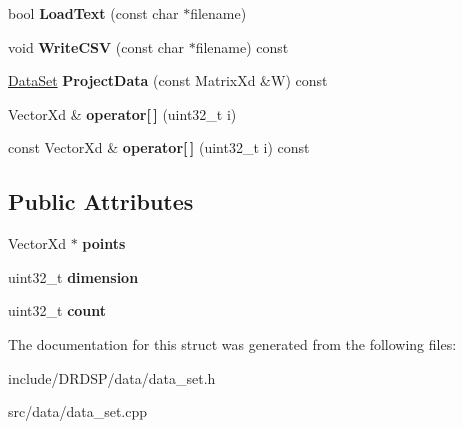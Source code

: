 \begin{DoxyCompactItemize}
\item 
\hypertarget{struct_d_r_d_s_p_1_1_data_set_a9caf2a2c685f1433028de6d3c11bd758}{bool {\bfseries Load\-Text} (const char $\ast$filename)}\label{struct_d_r_d_s_p_1_1_data_set_a9caf2a2c685f1433028de6d3c11bd758}

\item 
\hypertarget{struct_d_r_d_s_p_1_1_data_set_a1d90f86c1fbe0380d91158b1c050c501}{void {\bfseries Write\-C\-S\-V} (const char $\ast$filename) const }\label{struct_d_r_d_s_p_1_1_data_set_a1d90f86c1fbe0380d91158b1c050c501}

\item 
\hypertarget{struct_d_r_d_s_p_1_1_data_set_a0f42640d4f826807b69830bf3617152c}{\hyperlink{struct_d_r_d_s_p_1_1_data_set}{Data\-Set} {\bfseries Project\-Data} (const Matrix\-Xd \&W) const }\label{struct_d_r_d_s_p_1_1_data_set_a0f42640d4f826807b69830bf3617152c}

\item 
\hypertarget{struct_d_r_d_s_p_1_1_data_set_ae82340f4e02cb4ca434dc9361716eef0}{Vector\-Xd \& {\bfseries operator\mbox{[}$\,$\mbox{]}} (uint32\-\_\-t i)}\label{struct_d_r_d_s_p_1_1_data_set_ae82340f4e02cb4ca434dc9361716eef0}

\item 
\hypertarget{struct_d_r_d_s_p_1_1_data_set_a1349d1989fe1292e4c8e7ce4eb105b6c}{const Vector\-Xd \& {\bfseries operator\mbox{[}$\,$\mbox{]}} (uint32\-\_\-t i) const }\label{struct_d_r_d_s_p_1_1_data_set_a1349d1989fe1292e4c8e7ce4eb105b6c}

\end{DoxyCompactItemize}
\subsection*{Public Attributes}
\begin{DoxyCompactItemize}
\item 
\hypertarget{struct_d_r_d_s_p_1_1_data_set_a3b7ec561a02546bc111bd2ad69146cb7}{Vector\-Xd $\ast$ {\bfseries points}}\label{struct_d_r_d_s_p_1_1_data_set_a3b7ec561a02546bc111bd2ad69146cb7}

\item 
\hypertarget{struct_d_r_d_s_p_1_1_data_set_aa2598262725329c137e03b8947638780}{uint32\-\_\-t {\bfseries dimension}}\label{struct_d_r_d_s_p_1_1_data_set_aa2598262725329c137e03b8947638780}

\item 
\hypertarget{struct_d_r_d_s_p_1_1_data_set_a5e6912a9f2017bb2c97840a5d379c882}{uint32\-\_\-t {\bfseries count}}\label{struct_d_r_d_s_p_1_1_data_set_a5e6912a9f2017bb2c97840a5d379c882}

\end{DoxyCompactItemize}


The documentation for this struct was generated from the following files\-:\begin{DoxyCompactItemize}
\item 
include/\-D\-R\-D\-S\-P/data/data\-\_\-set.\-h\item 
src/data/data\-\_\-set.\-cpp\end{DoxyCompactItemize}
